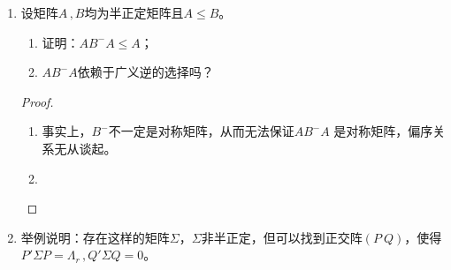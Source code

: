 \documentclass[10pt]{article}
\theoremstyle{definition}
\theoremstyle{definition}
\begin{document}
\begin{enumerate}
        \begin{proof}
            由初等变换，易见
            \begin{equation*}
                \begin{pmatrix}
                    A & B \\
                    C & D
                \end{pmatrix}
                \begin{pmatrix}
                    \mathrm{I} & -A^{-1}B \\
                    0 & \mathrm{I}
                \end{pmatrix}=
                \begin{pmatrix}
                    A & 0 \\
                    C & D-CA^{-1}B
                \end{pmatrix}
            \end{equation*}
            从而结论成立。
        \end{proof}

    \item	%
        设矩阵$A\, ,B$均为半正定矩阵且$A\le B$。
        \begin{enumerate}[label=(\roman*)]
            \item 证明：$AB^-A\le A$；\\
            \item$AB^-A$依赖于广义逆的选择吗？
        \end{enumerate}

        \begin{proof}
            \begin{enumerate}[label=(\roman*)]
                \def\labelenumi{(\roman{enumi})}
            \item
                事实上，$B^-$不一定是对称矩阵，从而无法保证$AB^-A$
                是对称矩阵，偏序关系无从谈起。
            \item
        \end{enumerate}
    \end{proof}

\item	%
    举例说明：存在这样的矩阵$\Sigma$，$\Sigma$非半正定，但可以找到正交阵$(P\  Q)$，使得$P'\Sigma P=\Lambda_r\, ,Q'\Sigma Q=0$。 


\end{enumerate}
\end{document}
